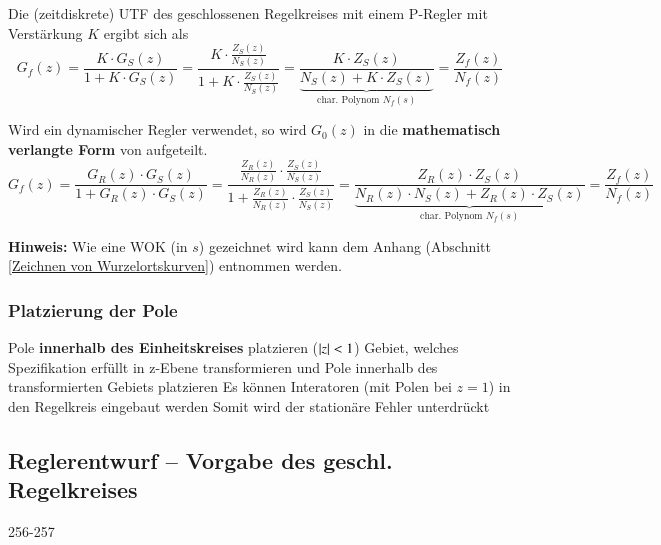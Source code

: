 \smallskip

Die (zeitdiskrete) UTF des geschlossenen Regelkreises mit einem P-Regler mit Verstärkung $K$ ergibt sich als
\vspace{-0.2cm}
$$ G_f(z) = \frac{K \cdot G_S(z)}{1 + K \cdot G_S(z)} = \frac{ K \cdot \frac{Z_S(z)}{N_S(z)} }{1 + K \cdot \frac{Z_S(z)}{N_S(z)}}
    = \frac{K \cdot Z_S(z) }{ \underbrace{N_S(z) + K \cdot Z_S(z) }_{\text{char. Polynom } N_f(s)} } = \frac{Z_f(z)}{N_f(z)} $$


Wird ein dynamischer Regler verwendet, so wird $G_0(z)$ in die \textbf{mathematisch verlangte Form} von aufgeteilt.
\vspace{-0.2cm}
$$ G_f(z) = \frac{G_R(z) \cdot G_S(z)}{1 + G_R(z) \cdot G_S(z)} = \frac{ \frac{Z_R(z)}{N_R(z)} \cdot \frac{Z_S(z)}{N_S(z)} }{1 + \frac{Z_R(z)}{N_R(z)} \cdot \frac{Z_S(z)}{N_S(z)}}
    = \frac{Z_R(z) \cdot Z_S(z) }{ \underbrace{N_R(z) \cdot N_S(z) + Z_R(z) \cdot Z_S(z) }_{\text{char. Polynom } N_f(s)} } = \frac{Z_f(z)}{N_f(z)} $$


\begingroup
{}
\endgroup

\smallskip

\textbf{Hinweis:} Wie eine WOK (in $s$) gezeichnet wird kann dem Anhang (Abschnitt \ref{Zeichnen von Wurzelortskurven}) entnommen werden.


\subsubsection{Platzierung der Pole}

\begin{outline}
    \1 Pole \textbf{innerhalb des Einheitskreises} platzieren ($\left|z\right| < 1$)
    \1 Gebiet, welches Spezifikation erfüllt in z-Ebene transformieren und Pole innerhalb des transformierten Gebiets platzieren
    \1 Es können Interatoren (mit Polen bei $z = 1$) in den Regelkreis eingebaut werden
        \2 Somit wird der stationäre Fehler unterdrückt
\end{outline}


\subsection{Reglerentwurf -- Vorgabe des geschl. Regelkreises}{256-257}


